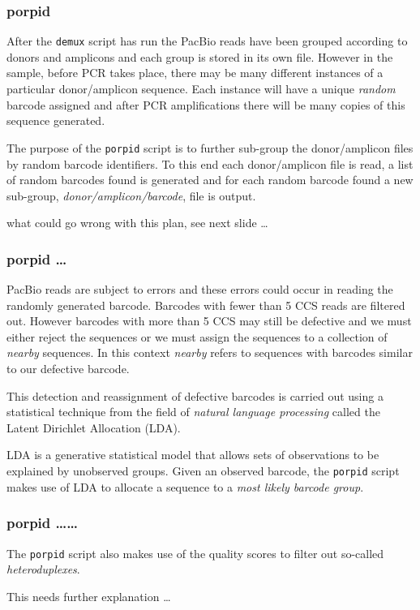 \documentclass{beamer}
\begin{document}
\begin{frame}[fragile]
\frametitle{porpid }

\alert<1> 

After the {\tt demux} script has run the PacBio reads have been grouped according to 
donors and amplicons and each group is stored in its own file. However in the sample,
before PCR takes place, there may be many different instances of a particular donor/amplicon
sequence. Each instance will have a unique {\em random} barcode assigned and after
PCR amplifications there will be many copies of this sequence generated.

\bigskip
The purpose of the {\tt porpid} script is to further sub-group the donor/amplicon files by random
barcode identifiers. To this end each donor/amplicon file is read, a list of random barcodes
found is generated and for each random barcode found a new sub-group, 
{\em donor/amplicon/barcode}, file is output.

\bigskip
what could go wrong with this plan, see next slide \ldots


\end{frame}

\begin{frame}[fragile]
\frametitle{porpid \ldots }

\alert<1> 

PacBio reads are subject to errors and these errors could occur in reading the randomly
generated barcode. Barcodes with fewer than 5 CCS reads are filtered out. 
However barcodes with more than 5 CCS may still be defective and we must either reject 
the sequences or we must assign the sequences to a collection of {\em nearby} sequences.
In this context {\em nearby} refers to sequences with barcodes similar to our defective barcode.

\bigskip
This detection and reassignment of defective barcodes is carried out using a statistical technique
from the field of {\em natural language processing} called the Latent Dirichlet Allocation (LDA).

\bigskip
LDA is a generative statistical model that allows sets of observations to be explained by unobserved groups. 
 Given an observed barcode, the {\tt porpid} script 
makes use of LDA to allocate a sequence to a {\em most likely barcode group}.

\end{frame}

\begin{frame}[fragile]
\frametitle{porpid \ldots \ldots }

The {\tt porpid} script also makes use of the quality scores to filter out so-called {\em heteroduplexes}.

\bigskip
{\color{red} This needs further explanation \ldots}

\end{frame}
\end{document}
